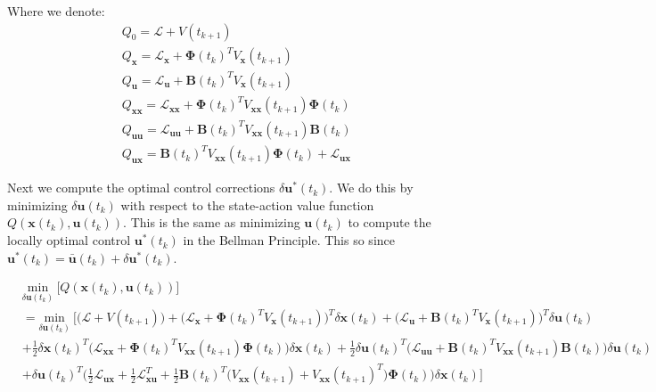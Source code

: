 \documentclass[11pt]{homework}
\renewcommand{\vec}[1]{\ensuremath{\boldsymbol{#1}}}
\begin{document}
\begin{arabicparts}
		Where we denote: 
		\begin{align*}
			& Q_{0} = \mathcal{L} +  V(t_{k+1})  \\
			& Q_{\vec{x}} = \mathcal{L}_{\vec{x}} + \vec{\Phi}(t_{k})^{T}V_{\vec{x}}(t_{k+1}) \\
			& Q_{\vec{u}} = \mathcal{L}_{\vec{u}} + \vec{B}(t_{k})^{T}V_{\vec{x}}(t_{k+1}) \\
			& Q_{\vec{xx}} = \mathcal{L}_{\vec{xx}} + \vec{\Phi}(t_{k})^{T}V_{\vec{xx}}(t_{k+1})\vec{\Phi}(t_{k}) \\
			& Q_{\vec{uu}} = \mathcal{L}_{\vec{uu}} + \vec{B}(t_{k})^{T}V_{\vec{xx}}(t_{k+1})\vec{B}(t_{k}) \\
			& Q_{\vec{ux}} = \vec{B}(t_{k})^{T}V_{\vec{xx}}(t_{k+1})\vec{\Phi}(t_{k}) + \mathcal{L}_{\vec{ux}}
		\end{align*}
	
	\newpage
		\questionpart
		
	
		Next we compute the optimal control corrections $\delta\vec{u}^{*}(t_{k})$. We do this by minimizing $\delta\vec{u}(t_{k})$ with respect to the state-action value function $Q(\vec{x}(t_{k}), \vec{u}(t_{k}))$. This is the same as minimizing $\vec{u}(t_{k})$ to compute the locally optimal control $\vec{u}^{*}(t_{k})$ in the Bellman Principle. This so since $\vec{u}^{*}(t_{k}) = \bar{\vec{u}}(t_{k}) + \delta\vec{u}^{*}(t_{k})$. 

			\begin{align*}
				& \underset{\delta\vec{u}(t_{k})}{\text{min}} ~ \Bigg[ Q(\vec{x}(t_{k}), \vec{u}(t_{k})) \Bigg] \\
				& = \underset{\delta\vec{u}(t_{k})}{\text{min}} ~ \Bigg[ \Big(\mathcal{L} +  V(t_{k+1})  \Big) + \Big(\mathcal{L}_{\vec{x}} + \vec{\Phi}(t_{k})^{T}V_{\vec{x}}(t_{k+1}) \Big)^{T}\delta\vec{x}(t_{k})  + \Big(\mathcal{L}_{\vec{u}} + \vec{B}(t_{k})^{T}V_{\vec{x}}(t_{k+1})\Big)^{T}\delta\vec{u}(t_{k}) \\
				& + \frac{1}{2}\delta\vec{x}(t_{k})^{T}\Big( \mathcal{L}_{\vec{xx}} + \vec{\Phi}(t_{k})^{T}V_{\vec{xx}}(t_{k+1})\vec{\Phi}(t_{k})\Big)\delta\vec{x}(t_{k}) + \frac{1}{2}\delta\vec{u}(t_{k})^{T}\Big( \mathcal{L}_{\vec{uu}} + \vec{B}(t_{k})^{T}V_{\vec{xx}}(t_{k+1})\vec{B}(t_{k})\Big)\delta\vec{u}(t_{k}) \\
				& + \delta\vec{u}(t_{k})^{T}\Bigg( \frac{1}{2}\mathcal{L}_{\vec{ux}} + \frac{1}{2}\mathcal{L}_{\vec{xu}}^{T} + \frac{1}{2}\vec{B}(t_{k})^{T}\Big(V_{\vec{xx}}(t_{k+1}) + V_{\vec{xx}}(t_{k+1})^{T}\Big) \vec{\Phi}(t_{k})\Bigg)\delta\vec{x}(t_{k})\Bigg]
			\end{align*}
			

\end{arabicparts}
\end{document}
